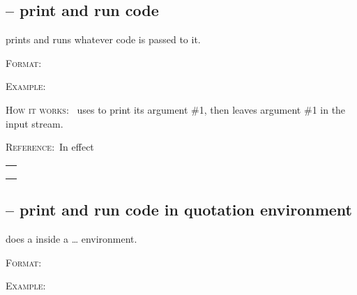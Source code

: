 \documentclass{article}
\newcommand{\ff}{\par\textsc{Format:~}}
\newcommand{\ee}{\par\textsc{Example:~}}
\newcommand{\hh}{\par\textsc{How it works:~}}
\newcommand{\rr}{\par\textsc{Reference:~}}
\newcommand{\reftable}[1]{%
\begin{center}
\begin{tabular}{l}
#1 
\end{tabular}
\end{center}

}
\begin{document}
\subsection{\cs{\cdr} -- print and run code}
\cs{\cdr} prints and runs whatever code is passed to it.
\ff\cs{\cdr}
\ee
{}
\hh\cs{\cdr} uses \codedetok{\detokenize} to print its argument \#1, then leaves argument \#1 in the input stream.
\rr In effect
\par\reftable{\codedetokb{\detokenize\{\#1\}} \\ \codegeneral{\$\textbackslash mapsto\$} \\ \codegeneral{\#1} \\}


\subsection{\cs{\cdrq} -- print and run code in quotation environment}
\cs{\cdrq} does a \cs{\cdr} inside a  \ldots  {} environment.
\ff\cs{\cdrq}
\ee
{}
\end{document}

